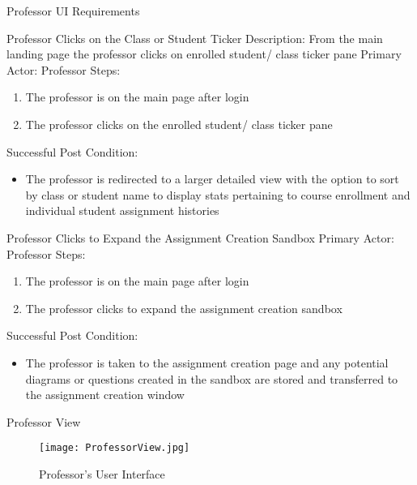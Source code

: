 \documentclass{article}
\begin{document}
\begin{section}{Professor UI Requirements}
\begin{subsection}{Professor Clicks on the Class or Student Ticker}
Description: From the main landing page the professor clicks on enrolled student/ class ticker pane \newline
Primary Actor: Professor \newline
Steps:
\begin{enumerate}
\item{The professor is on the main page after login}
\item{The professor clicks on the enrolled student/ class ticker pane}
\end{enumerate}
Successful Post Condition:
\begin{itemize}
\item The professor is redirected to a larger detailed view with the option to sort by class or student name to display stats pertaining to course enrollment and individual student assignment histories
\end{itemize}
\end{subsection}

\begin{subsection}{Professor Clicks to Expand the Assignment Creation Sandbox}
Primary Actor: Professor \newline
Steps:
\begin{enumerate}
\item{The professor is on the main page after login} 
\item{The professor clicks to expand the assignment creation sandbox}
\end{enumerate}
Successful Post Condition:
\begin{itemize}
\item{The professor is taken to the assignment creation page and any potential diagrams or questions created in the sandbox are stored and transferred to the assignment creation window}
\end{itemize}
\end{subsection}

\newpage

\begin{subsection}{Professor View}
\begin{figure}[h!]
        \centerline{\texttt{[image: ProfessorView.jpg]}}
        \caption{Professor's User Interface}
\end{figure}
\end{subsection}
\newpage


\end{section}
\end{document}
